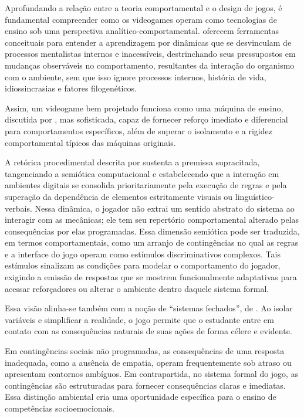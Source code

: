 \documentclass[portuguese]{textolivre}
\begin{document}
Aprofundando a relação entre a teoria comportamental e o design de jogos, é fundamental compreender como os videogames operam como tecnologias de ensino sob uma perspectiva analítico-comportamental. \textcite{skinner1974behaviorismo,baum2019compreender} oferecem ferramentas conceituais para entender a aprendizagem por dinâmicas que se desvinculam de processos mentalistas internos e inacessíveis, destrinchando seus pressupostos em mudanças observáveis no comportamento, resultantes da interação do organismo com o ambiente, sem que isso ignore processos internos, história de vida, idiossincrasias e fatores filogenéticos.

Assim, um videogame bem projetado funciona como uma máquina de ensino, discutida por \textcite{skinner1972tecnologia}, mas sofisticada, capaz de fornecer reforço imediato e diferencial para comportamentos específicos, além de superar o isolamento e a rigidez comportamental típicos das máquinas originais.

A retórica procedimental descrita por \textcite{bogost2011how} sustenta a premissa supracitada, tangenciando a semiótica computacional e estabelecendo que a interação em ambientes digitais se consolida prioritariamente pela execução de regras e pela superação da dependência de elementos estritamente visuais ou linguístico-verbais. Nessa dinâmica, o jogador não extrai um sentido abstrato do sistema ao interagir com as mecânicas; ele tem seu repertório comportamental alterado pelas consequências por elas programadas. Essa dimensão semiótica pode ser traduzida, em termos comportamentais, como um arranjo de contingências no qual as regras e a interface do jogo operam como estímulos discriminativos complexos. Tais estímulos sinalizam as condições para modelar o comportamento do jogador, exigindo a emissão de respostas que se mostrem funcionalmente adaptativas para acessar reforçadores ou alterar o ambiente dentro daquele sistema formal.

Essa visão alinha-se também com a noção de “sistemas fechados”, de \textcite{crawford1984art}. Ao isolar variáveis e simplificar a realidade, o jogo permite que o estudante entre em contato com as consequências naturais de suas ações de forma célere e evidente.

Em contingências sociais não programadas, as consequências de uma resposta inadequada, como a ausência de empatia, operam frequentemente sob atraso ou apresentam contornos ambíguos. Em contrapartida, no sistema formal do jogo, as contingências são estruturadas para fornecer consequências claras e imediatas. Essa distinção ambiental cria uma oportunidade específica para o ensino de competências socioemocionais.
\end{document}
